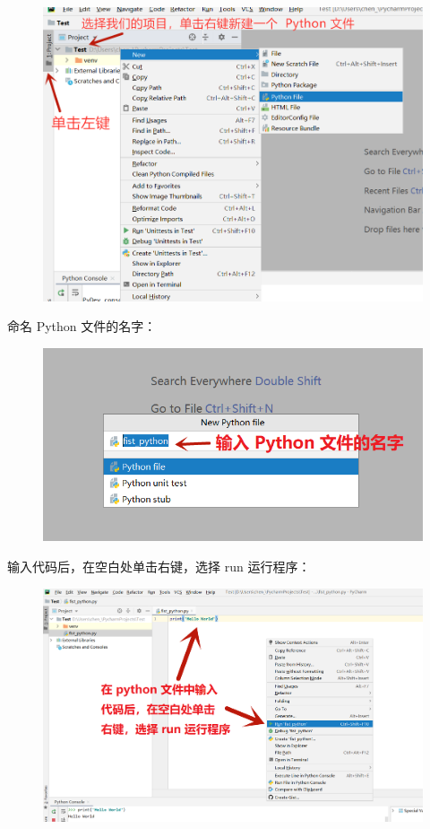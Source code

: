 \begin{figure}[!ht]
  \centering
  \includegraphics[scale=0.5]{figure/chapter1/pycharm15.png}
\end{figure}

命名 Python 文件的名字：

\begin{figure}[!ht]
  \centering
  \includegraphics[scale=0.6]{figure/chapter1/pycharm16.png}
\end{figure}

输入代码后，在空白处单击右键，选择 run 运行程序：

\begin{figure}[!ht]
  \centering
  \includegraphics[scale=0.4]{figure/chapter1/pycharm17.png}
\end{figure}

